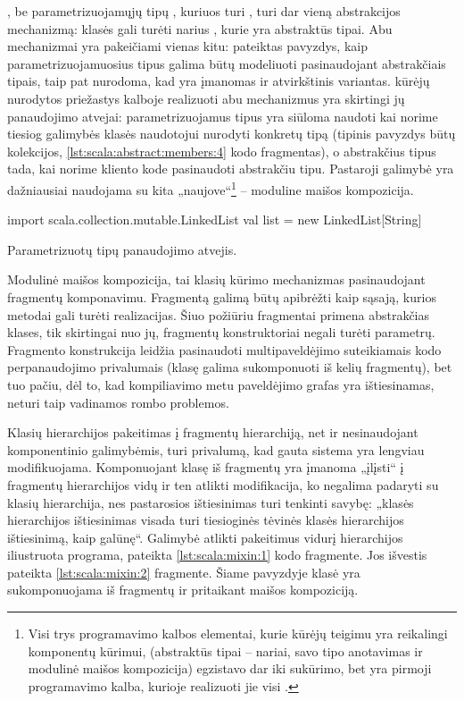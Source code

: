 , be parametrizuojamųjų tipų , kuriuos
turi , turi dar vieną abstrakcijos mechanizmą:
 klasės gali turėti narius , kurie
yra abstraktūs tipai. Abu mechanizmai yra pakeičiami vienas kitu:
\cite[10]{scala-overview} pateiktas pavyzdys, kaip parametrizuojamuosius
tipus galima būtų modeliuoti pasinaudojant abstrakčiais tipais, taip
pat nurodoma, kad yra įmanomas ir atvirkštinis variantas.
 kūrėjų \cite[11]{scala-overview} nurodytos
priežastys kalboje realizuoti abu mechanizmus yra skirtingi jų
panaudojimo atvejai: parametrizuojamus tipus yra siūloma naudoti kai
norime tiesiog galimybės klasės naudotojui nurodyti konkretų tipą
(tipinis pavyzdys būtų kolekcijos, \ref{lst:scala:abstract:members:4}
kodo fragmentas), o abstrakčius tipus tada, kai norime kliento kode
pasinaudoti abstrakčiu tipu. Pastaroji galimybė yra dažniausiai
naudojama su kita  „naujove“\footnote{
Visi trys programavimo kalbos elementai, kurie 
kūrėjų teigimu yra reikalingi komponentų kūrimui, (abstraktūs
tipai – nariai, savo tipo anotavimas ir modulinė maišos kompozicija)
egzistavo dar iki  sukūrimo, bet 
yra pirmoji programavimo kalba, kurioje realizuoti jie visi
\cite[2]{scalable-component-abstractions}.} – moduline maišos
kompozicija.

\begin{listing}[h]
  \begin{scalacode}
    import scala.collection.mutable.LinkedList
    val list = new LinkedList[String]
  \end{scalacode}
  \caption{Parametrizuotų tipų panaudojimo atvejis.}
  \label{lst:scala:abstract:members:4}
\end{listing}

Modulinė maišos kompozicija, tai klasių kūrimo mechanizmas
pasinaudojant fragmentų  komponavimu. Fragmentą galimą
būtų apibrėžti kaip sąsają, kurios metodai gali turėti
realizacijas. Šiuo požiūriu fragmentai primena abstrakčias klases,
tik skirtingai nuo jų, fragmentų konstruktoriai negali turėti
parametrų. Fragmento konstrukcija leidžia pasinaudoti
multipaveldėjimo suteikiamais kodo perpanaudojimo privalumais
(klasę galima sukomponuoti iš kelių fragmentų), bet tuo pačiu, dėl
to, kad kompiliavimo metu paveldėjimo grafas yra ištiesinamas, neturi
taip vadinamos rombo problemos.

Klasių hierarchijos pakeitimas į fragmentų hierarchiją, net ir
nesinaudojant komponentinio galimybėmis, turi privalumą, kad
gauta sistema yra lengviau modifikuojama. Komponuojant klasę iš
fragmentų yra įmanoma „įlįsti“ į fragmentų hierarchijos vidų
ir ten atlikti modifikacija, ko negalima padaryti su klasių hierarchija,
nes pastarosios ištiesinimas turi tenkinti savybę: „klasės hierarchijos
ištiesinimas visada turi tiesioginės tėvinės klasės hierarchijos
ištiesinimą, kaip galūnę“\cite[57p.]{scala-reference}. Galimybė
atlikti pakeitimus vidurį hierarchijos iliustruota programa,
pateikta \ref{lst:scala:mixin:1} kodo fragmente. Jos išvestis pateikta
\ref{lst:scala:mixin:2} fragmente. Šiame pavyzdyje klasė 
yra sukomponuojama iš fragmentų  ir  pritaikant
maišos kompoziciją.

